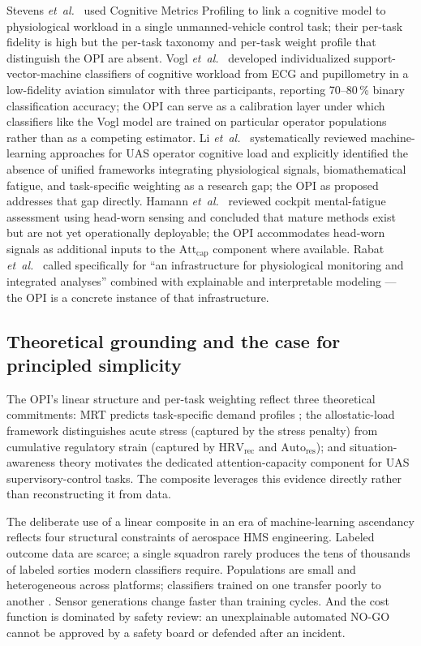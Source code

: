 \documentclass[10pt,journal,twocolumn,compsoc]{IEEEtran}
\begin{document}
Stevens \textit{et~al.}~\cite{stevens2022} used Cognitive Metrics Profiling to link a cognitive model to physiological workload in a single unmanned-vehicle control task; their per-task fidelity is high but the per-task taxonomy and per-task weight profile that distinguish the OPI are absent. Vogl \textit{et~al.}~\cite{vogl2025} developed individualized support-vector-machine classifiers of cognitive workload from ECG and pupillometry in a low-fidelity aviation simulator with three participants, reporting 70--80\,\% binary classification accuracy; the OPI can serve as a calibration layer under which classifiers like the Vogl model are trained on particular operator populations rather than as a competing estimator. Li \textit{et~al.}~\cite{li2025} systematically reviewed machine-learning approaches for UAS operator cognitive load and explicitly identified the absence of unified frameworks integrating physiological signals, biomathematical fatigue, and task-specific weighting as a research gap; the OPI as proposed addresses that gap directly. Hamann \textit{et~al.}~\cite{hamann2026} reviewed cockpit mental-fatigue assessment using head-worn sensing and concluded that mature methods exist but are not yet operationally deployable; the OPI accommodates head-worn signals as additional inputs to the $\mathrm{Att_{cap}}$ component where available. Rabat \textit{et~al.}~\cite{rabat2025} called specifically for ``an infrastructure for physiological monitoring and integrated analyses'' combined with explainable and interpretable modeling --- the OPI is a concrete instance of that infrastructure.

\subsection{Theoretical grounding and the case for principled simplicity}
\label{sec:simplicity}
The OPI's linear structure and per-task weighting reflect three theoretical commitments: MRT predicts task-specific demand profiles \cite{wickens2002,wickens2008}; the allostatic-load framework \cite{mcewen1998} distinguishes acute stress (captured by the stress penalty) from cumulative regulatory strain (captured by $\mathrm{HRV_{rec}}$ and $\mathrm{Auto_{res}}$); and situation-awareness theory \cite{endsley1995} motivates the dedicated attention-capacity component for UAS supervisory-control tasks. The composite leverages this evidence directly rather than reconstructing it from data.

The deliberate use of a linear composite in an era of machine-learning ascendancy reflects four structural constraints of aerospace HMS engineering. Labeled outcome data are scarce; a single squadron rarely produces the tens of thousands of labeled sorties modern classifiers require. Populations are small and heterogeneous across platforms; classifiers trained on one transfer poorly to another \cite{vogl2025}. Sensor generations change faster than training cycles. And the cost function is dominated by safety review: an unexplainable automated NO-GO cannot be approved by a safety board or defended after an incident.
\end{document}
